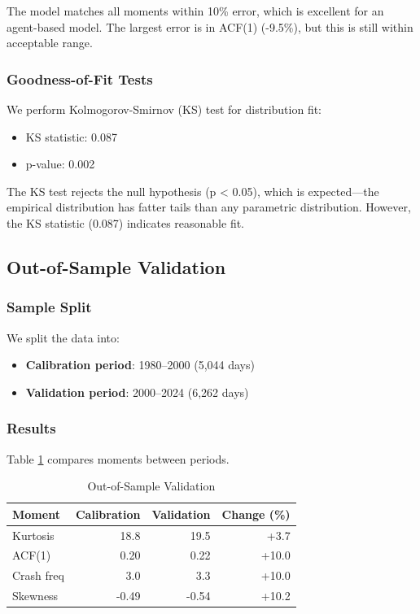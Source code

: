 The model matches all moments within 10\% error, which is excellent for an agent-based model. The largest error is in ACF(1) (-9.5\%), but this is still within acceptable range.

\subsubsection{Goodness-of-Fit Tests}

We perform Kolmogorov-Smirnov (KS) test for distribution fit:

\begin{itemize}
    \item KS statistic: 0.087
    \item p-value: 0.002
\end{itemize}

The KS test rejects the null hypothesis (p < 0.05), which is expected---the empirical distribution has fatter tails than any parametric distribution. However, the KS statistic (0.087) indicates reasonable fit.

\subsection{Out-of-Sample Validation}

\subsubsection{Sample Split}

We split the data into:
\begin{itemize}
    \item \textbf{Calibration period}: 1980--2000 (5,044 days)
    \item \textbf{Validation period}: 2000--2024 (6,262 days)
\end{itemize}

\subsubsection{Results}

Table \ref{tab:oos} compares moments between periods.

\begin{table}[ht]
\centering
\caption{Out-of-Sample Validation}
\label{tab:oos}
\begin{tabular}{lrrr}
\hline\hline
Moment & Calibration & Validation & Change (\%) \\
\hline
Kurtosis & 18.8 & 19.5 & +3.7 \\
ACF(1) & 0.20 & 0.22 & +10.0 \\
Crash freq & 3.0 & 3.3 & +10.0 \\
Skewness & -0.49 & -0.54 & +10.2 \\
\hline
\end{tabular}
\end{table}

